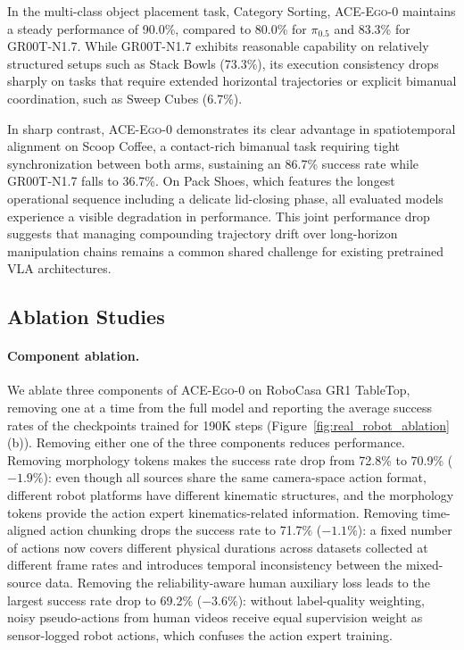 \documentclass{article}
\newcommand{\OURS}{\textsc{ACE-Ego-0}\xspace}
\newcommand{\Ours}{\OURS}
\begin{document}
In the multi-class object placement task, Category Sorting, \Ours maintains a steady performance of 90.0\%, compared to 80.0\% for $\pi_{0.5}$ and 83.3\% for GR00T-N1.7. While GR00T-N1.7 exhibits reasonable capability on relatively structured setups such as Stack Bowls (73.3\%), its execution consistency drops sharply on tasks that require extended horizontal trajectories or explicit bimanual coordination, such as Sweep Cubes (6.7\%).

In sharp contrast, \Ours demonstrates its clear advantage in spatiotemporal alignment on Scoop Coffee, a contact-rich bimanual task requiring tight synchronization between both arms, sustaining an 86.7\% success rate while GR00T-N1.7 falls to 36.7\%. On Pack Shoes, which features the longest operational sequence including a delicate lid-closing phase, all evaluated models experience a visible degradation in performance. This joint performance drop suggests that managing compounding trajectory drift over long-horizon manipulation chains remains a common shared challenge for existing pretrained VLA architectures.


\subsection{Ablation Studies}
\label{sec:ablation_studies}

\paragraph{Component ablation.}
We ablate three components of \Ours on RoboCasa GR1 TableTop, removing one at a time from the full model and reporting the average success rates of the checkpoints trained for 190K steps (Figure~\ref{fig:real_robot_ablation}(b)).
Removing either one of the three components reduces performance.
Removing morphology tokens makes the success rate drop from 72.8\% to 70.9\% ($-1.9\%$): even though all sources share the same camera-space action format, different robot platforms have different kinematic structures, and the morphology tokens provide the action expert kinematics-related information.
Removing time-aligned action chunking drops the success rate to 71.7\% ($-1.1\%$): a fixed number of actions now covers different physical durations across datasets collected at different frame rates and introduces temporal inconsistency between the mixed-source data.
Removing the reliability-aware human auxiliary loss leads to the largest success rate drop to 69.2\% ($-3.6\%$): without label-quality weighting, noisy pseudo-actions from human videos receive equal supervision weight as sensor-logged robot actions, which confuses the action expert training.
\end{document}
